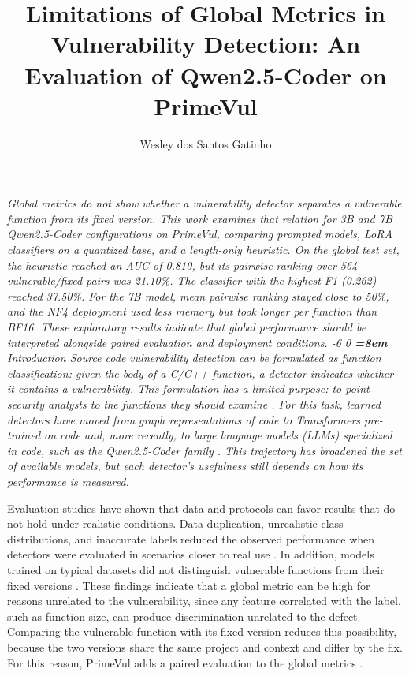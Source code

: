 \documentclass[12pt,a4paper]{article}
\title{Limitations of Global Metrics in Vulnerability Detection: An Evaluation of Qwen2.5-Coder on PrimeVul}
\author{Wesley dos Santos Gatinho}
\makeatletter
\newcommand{\XIIIPT}{\@setfontsize\xiiipt{13}{17}}
\renewcommand\section{\@startsection{section}{1}{\z@}%
                       {-6\p@ \@plus -4\p@ \@minus -4\p@}%
                       {0\p@ \@plus 4\p@ \@minus 4\p@}%
                       {\normalfont\XIIIPT\bfseries\boldmath
                        \rightskip=\z@ \@plus 8em\pretolerance=10000 }}
\let\maketitleOLD\maketitle
\renewcommand{\maketitle}{\maketitleOLD\thispagestyle{empty}}
\renewenvironment{abstract}{%
      \list{}{\advance\topsep by6pt\relax%
      \leftmargin=0.8cm
      \labelwidth=\z@
      \listparindent=\z@
      \itemindent\listparindent
      \rightmargin\leftmargin}\item[\hskip\labelsep
                                    \bfseries\itshape Abstract.]\itshape}%
      {\endlist}
\makeatother
\begin{document}
\maketitle
\begin{abstract}
Global metrics do not show whether a vulnerability detector separates a vulnerable function from its fixed version. This work examines that relation for 3B and 7B Qwen2.5-Coder configurations on PrimeVul, comparing prompted models, LoRA classifiers on a quantized base, and a length-only heuristic. On the global test set, the heuristic reached an AUC of 0.810, but its pairwise ranking over 564 vulnerable/fixed pairs was 21.10\%. The classifier with the highest F1 (0.262) reached 37.50\%. For the 7B model, mean pairwise ranking stayed close to 50\%, and the NF4 deployment used less memory but took longer per function than BF16. These exploratory results indicate that global performance should be interpreted alongside paired evaluation and deployment conditions.
\end{abstract}
\section{Introduction}\label{sec:1}
Source code vulnerability detection can be formulated as function classification: given the body of a C/C++ function, a detector indicates whether it contains a vulnerability. This formulation has a limited purpose: to point security analysts to the functions they should examine \citep{fu2022linevul}. For this task, learned detectors have moved from graph representations of code \citep{zhou2019devign} to Transformers pre-trained on code \citep{fu2022linevul} and, more recently, to large language models (LLMs) specialized in code, such as the Qwen2.5-Coder family \citep{hui2024qwen}. This trajectory has broadened the set of available models, but each detector's usefulness still depends on how its performance is measured.

Evaluation studies have shown that data and protocols can favor results that do not hold under realistic conditions. Data duplication, unrealistic class distributions, and inaccurate labels reduced the observed performance when detectors were evaluated in scenarios closer to real use \citep{chakraborty2020reveal,ding2024primevul}. In addition, models trained on typical datasets did not distinguish vulnerable functions from their fixed versions \citep{risse2024limits}. These findings indicate that a global metric can be high for reasons unrelated to the vulnerability, since any feature correlated with the label, such as function size, can produce discrimination unrelated to the defect. Comparing the vulnerable function with its fixed version reduces this possibility, because the two versions share the same project and context and differ by the fix. For this reason, PrimeVul adds a paired evaluation to the global metrics \citep{ding2024primevul}.
\end{document}
